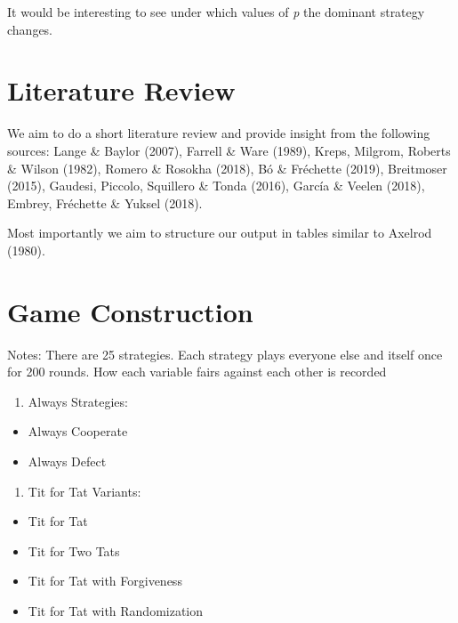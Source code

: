 \documentclass[11pt,preprint]{elsarticle}
\numberwithin{equation}{section}
\numberwithin{figure}{section}
\numberwithin{table}{section}
\def\tightlist{} %
\begin{document}
It would be interesting to see under which values of \emph{p} the
dominant strategy changes.

\section{\texorpdfstring{Literature
Review\label{litreview}}{Literature Review}}\label{literature-review}

We aim to do a short literature review and provide insight from the
following sources: Lange \& Baylor (2007), Farrell \& Ware (1989),
Kreps, Milgrom, Roberts \& Wilson (1982), Romero \& Rosokha (2018), Bó
\& Fréchette (2019), Breitmoser (2015), Gaudesi, Piccolo, Squillero \&
Tonda (2016), García \& Veelen (2018), Embrey, Fréchette \& Yuksel
(2018).

Most importantly we aim to structure our output in tables similar to
Axelrod (1980).

\section{Game Construction}\label{game-construction}

Notes: There are 25 strategies. Each strategy plays everyone else and
itself once for 200 rounds. How each variable fairs against each other
is recorded

\begin{enumerate}
\def\labelenumi{\arabic{enumi}.}
\tightlist
\item
  Always Strategies:
\end{enumerate}

\begin{itemize}
\tightlist
\item
  Always Cooperate
\item
  Always Defect
\end{itemize}

\begin{enumerate}
\def\labelenumi{\arabic{enumi}.}
\setcounter{enumi}{1}
\tightlist
\item
  Tit for Tat Variants:
\end{enumerate}

\begin{itemize}
\tightlist
\item
  Tit for Tat
\item
  Tit for Two Tats
\item
  Tit for Tat with Forgiveness
\item
  Tit for Tat with Randomization
\end{itemize}
\end{document}
